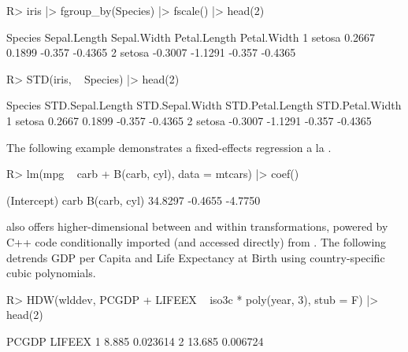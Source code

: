 \documentclass[article]{jss}
\begin{document}
\begin{Schunk}
\begin{Sinput}
R> iris |> fgroup_by(Species) |> fscale() |> head(2)
\end{Sinput}
\begin{Soutput}
  Species Sepal.Length Sepal.Width Petal.Length Petal.Width
1  setosa       0.2667      0.1899       -0.357     -0.4365
2  setosa      -0.3007     -1.1291       -0.357     -0.4365
\end{Soutput}
\begin{Sinput}
R> STD(iris, ~ Species) |> head(2)
\end{Sinput}
\begin{Soutput}
  Species STD.Sepal.Length STD.Sepal.Width STD.Petal.Length STD.Petal.Width
1  setosa           0.2667          0.1899           -0.357         -0.4365
2  setosa          -0.3007         -1.1291           -0.357         -0.4365
\end{Soutput}
\end{Schunk}
The following example demonstrates a fixed-effects regression a la \citet{mundlak1978pooling}.
\begin{Schunk}
\begin{Sinput}
R> lm(mpg ~ carb + B(carb, cyl), data = mtcars) |> coef()
\end{Sinput}
\begin{Soutput}
 (Intercept)         carb B(carb, cyl) 
     34.8297      -0.4655      -4.7750 
\end{Soutput}
\end{Schunk}
 also offers higher-dimensional between and within transformations, powered by C++ code conditionally imported (and accessed directly) from . The following detrends GDP per Capita and Life Expectancy at Birth using country-specific cubic polynomials.
\begin{Schunk}
\begin{Sinput}
R> HDW(wlddev, PCGDP + LIFEEX ~ iso3c * poly(year, 3), stub = F) |> head(2)
\end{Sinput}
\begin{Soutput}
   PCGDP   LIFEEX
1  8.885 0.023614
2 13.685 0.006724
\end{Soutput}
\end{Schunk}
%
\end{document}
